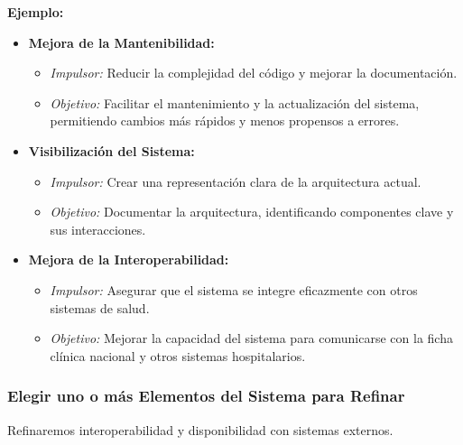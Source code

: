 \textbf{Ejemplo:}
\begin{itemize}
    \item \textbf{Mejora de la Mantenibilidad:}
    \begin{itemize}
        \item \textit{Impulsor:} Reducir la complejidad del código y mejorar la documentación.
        \item \textit{Objetivo:} Facilitar el mantenimiento y la actualización del sistema, permitiendo cambios más rápidos y menos propensos a errores.
    \end{itemize}
    \item \textbf{Visibilización del Sistema:}
    \begin{itemize}
        \item \textit{Impulsor:} Crear una representación clara de la arquitectura actual.
        \item \textit{Objetivo:} Documentar la arquitectura, identificando componentes clave y sus interacciones.
    \end{itemize}
    \item \textbf{Mejora de la Interoperabilidad:}
    \begin{itemize}
        \item \textit{Impulsor:} Asegurar que el sistema se integre eficazmente con otros sistemas de salud.
        \item \textit{Objetivo:} Mejorar la capacidad del sistema para comunicarse con la ficha clínica nacional y otros sistemas hospitalarios.
    \end{itemize}
\end{itemize}


\subsubsection{Elegir uno o más Elementos del Sistema para Refinar}

Refinaremos interoperabilidad y disponibilidad con sistemas externos. 

